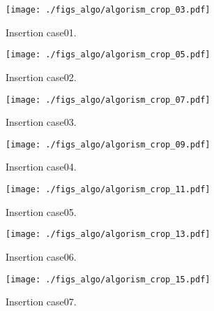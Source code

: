 \begin{figure}[h]
  \vspace{-0.5cm}
  \texttt{[image: ./figs\_algo/algorism\_crop\_03.pdf]}
  \caption{
    Insertion case01.
  }
  \label{fig_IpCHashT_insert_hard_case01}
  \vspace{-0.5cm}
\end{figure}

\begin{figure}[h]
  \vspace{-0.5cm}
  \texttt{[image: ./figs\_algo/algorism\_crop\_05.pdf]}
  \caption{
    Insertion case02.
  }
  \label{fig_IpCHashT_insert_hard_case02}
  \vspace{-0.5cm}
\end{figure}

\begin{figure}[h]
  \vspace{-0.5cm}
  \texttt{[image: ./figs\_algo/algorism\_crop\_07.pdf]}
  \caption{
    Insertion case03.
  }
  \label{fig_IpCHashT_insert_hard_case03}
  \vspace{-0.5cm}
\end{figure}

\begin{figure}[h]
  \vspace{-0.5cm}
  \texttt{[image: ./figs\_algo/algorism\_crop\_09.pdf]}
  \caption{
    Insertion case04.
  }
  \label{fig_IpCHashT_insert_hard_case04}
  \vspace{-0.5cm}
\end{figure}

\begin{figure}[h]
  \vspace{-0.5cm}
  \texttt{[image: ./figs\_algo/algorism\_crop\_11.pdf]}
  \caption{
    Insertion case05.
  }
  \label{fig_IpCHashT_insert_hard_case05}
\end{figure}

\begin{figure}[h]
  \vspace{-0.5cm}
  \texttt{[image: ./figs\_algo/algorism\_crop\_13.pdf]}
  \caption{
    Insertion case06.
  }
  \label{fig_IpCHashT_insert_hard_case06}
  \vspace{-0.5cm}
\end{figure}

\begin{figure}[h]
  \vspace{-0.5cm}
  \texttt{[image: ./figs\_algo/algorism\_crop\_15.pdf]}
  \caption{
    Insertion case07.
  }
  \label{fig_IpCHashT_insert_hard_case07}
  \vspace{-0.5cm}
\end{figure}

